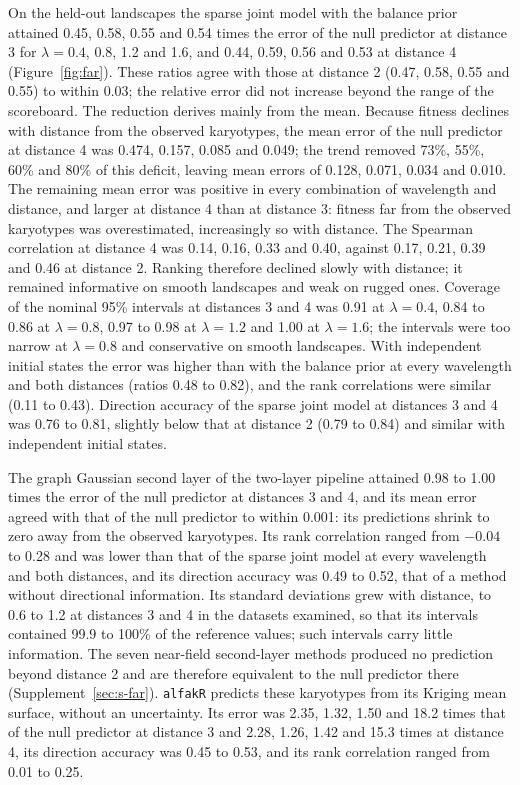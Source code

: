 \documentclass[11pt]{article}
\begin{document}
On the held-out landscapes the sparse joint model with the balance prior
attained 0.45, 0.58, 0.55 and 0.54 times the error of the null predictor at
distance 3 for $\lambda=0.4$, 0.8, 1.2 and 1.6, and 0.44, 0.59, 0.56 and 0.53
at distance 4 (Figure~\ref{fig:far}). These ratios agree with those at
distance 2 (0.47, 0.58, 0.55 and 0.55) to within 0.03; the relative error did
not increase beyond the range of the scoreboard. The reduction derives mainly
from the mean. Because fitness declines with distance from the observed
karyotypes, the mean error of the null predictor at distance 4 was 0.474,
0.157, 0.085 and 0.049; the trend removed 73\%, 55\%, 60\% and 80\% of this
deficit, leaving mean errors of 0.128, 0.071, 0.034 and 0.010. The remaining
mean error was positive in every combination of wavelength and distance, and
larger at distance 4 than at distance 3: fitness far from the observed
karyotypes was overestimated, increasingly so with distance. The Spearman
correlation at distance 4 was 0.14, 0.16, 0.33 and 0.40, against 0.17, 0.21,
0.39 and 0.46 at distance 2. Ranking therefore declined slowly with distance;
it remained informative on smooth landscapes and weak on rugged ones.
Coverage of the nominal 95\% intervals at distances 3 and 4 was 0.91 at
$\lambda=0.4$, 0.84 to 0.86 at $\lambda=0.8$, 0.97 to 0.98 at $\lambda=1.2$
and 1.00 at $\lambda=1.6$; the intervals were too narrow at $\lambda=0.8$ and
conservative on smooth landscapes. With independent initial states the error
was higher than with the balance prior at every wavelength and both distances
(ratios 0.48 to 0.82), and the rank correlations were similar (0.11 to 0.43).
Direction accuracy of the sparse joint model at distances 3 and 4 was 0.76 to
0.81, slightly below that at distance 2 (0.79 to 0.84) and similar with
independent initial states.

The graph Gaussian second layer of the two-layer pipeline attained 0.98 to
1.00 times the error of the null predictor at distances 3 and 4, and its mean
error agreed with that of the null predictor to within 0.001: its predictions
shrink to zero away from the observed karyotypes. Its rank correlation ranged
from $-0.04$ to 0.28 and was lower than that of the sparse joint model at
every wavelength and both distances, and its direction accuracy was 0.49 to
0.52, that of a method without directional information. Its standard
deviations grew with
distance, to 0.6 to 1.2 at distances 3 and 4 in the datasets examined, so
that its intervals contained 99.9 to 100\% of the reference values; such
intervals carry little information. The seven near-field
second-layer methods produced no prediction beyond distance 2 and are
therefore equivalent to the null predictor there
(Supplement~\ref{sec:s-far}). \texttt{alfakR} predicts these karyotypes from
its Kriging mean surface, without an uncertainty. Its error was 2.35, 1.32,
1.50 and 18.2 times that of the null predictor at distance 3 and 2.28, 1.26,
1.42 and 15.3 times at distance 4, its direction accuracy was 0.45 to 0.53,
and its rank correlation ranged from 0.01 to 0.25.
\end{document}
